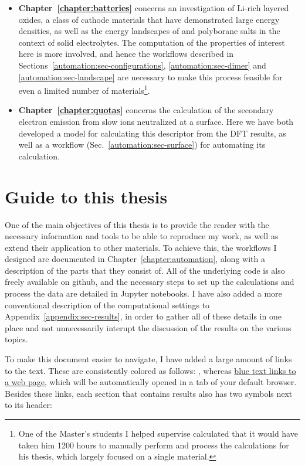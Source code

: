 \begin{refsection}
\begin{itemize}[]
\item \textbf{Chapter~\ref{chapter:batteries}} concerns an investigation of Li-rich layered oxides, a class of cathode materials that have demonstrated large energy densities, as well as the energy landscapes of  and  polyborane salts in the context of solid electrolytes. The computation of the properties of interest here is more involved, and hence the workflows described in Sections~\ref{automation:sec-configurations}, \ref{automation:sec-dimer} and \ref{automation:sec-landscape} are necessary to make this process feasible for even a limited number of materials\footnote{One of the Master's students I helped supervise calculated that it would have taken him 1200 hours to manually perform and process the calculations for his thesis, which largely focused on a single material.}.

\item \textbf{Chapter~\ref{chapter:quotas}} concerns the calculation of the secondary electron emission from slow ions neutralized at a surface. Here we have both developed a model for calculating this descriptor from the DFT results, as well as a workflow (Sec.~\ref{automation:sec-surface}) for automating its calculation.

\end{itemize}

\section{Guide to this thesis} \label{intro:sec-guide}

One of the main objectives of this thesis is to provide the reader with the necessary information and tools to be able to reproduce my work, as well as extend their application to other materials. To achieve this, the workflows I designed are documented in Chapter~\ref{chapter:automation}, along with a description of the parts that they consist of. All of the underlying code is also freely available on github, and the necessary steps to set up the calculations and process the data are detailed in Jupyter notebooks. I have also added a more conventional description of the computational settings to Appendix~\ref{appendix:sec-results}, in order to gather all of these details in one place and not unnecessarily interupt the discussion of the results on the various topics.

To make this document easier to navigate, I have added a large amount of links to the text. These are consistently colored as follows: , whereas \href{https://github.com/mbercx/phd-thesis}{blue text links to a web page}, which will be automatically opened in a tab of your default browser. Besides these links, each section that contains results also has two symbols next to its header:


\end{refsection}
